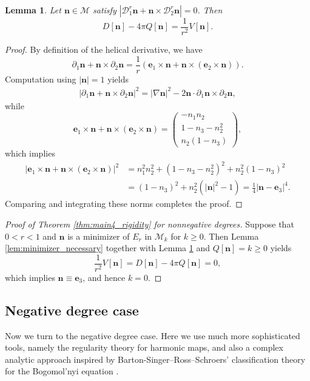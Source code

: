 \documentclass{amsart}
\numberwithin{equation}{section}
\newtheorem{lemma}[theorem]{Lemma}
\theoremstyle{definition}
\theoremstyle{remark}
\newcommand{\boD}{\mathcal{D}}
\newcommand{\boM}{\mathcal{M}}
\newcommand{\rd}{{\partial}}								%
\newcommand{\nab}{{\nabla}}							%
\newcommand{\bn}{{\mathbf{n}}}
\newcommand{\boe}{{\mathbf{e}}}
\begin{document}
\begin{lemma}\label{L9}
Let $\bn\in \boM$ satisfy $|\boD^r_1 \bn + \bn\times \boD^r_2 \bn| =0$. Then
$$
D[\bn] - 4\pi Q[\bn] = \frac 1{r^2} V[\bn].
$$
\end{lemma}
\begin{proof}
By definition of the helical derivative, we have
$$
\rd_1 \bn + \bn \times \rd_2 \bn = \frac 1r \left( \boe_1 \times \bn + \bn\times (\boe_2\times \bn)
\right).
$$
Computation using $|\bn|=1$ yields
\begin{align*}
|\rd_1 \bn + \bn\times \rd_2\bn|^2 = |\nab \bn|^2 - 2\bn\cdot \rd_1\bn \times \rd_2\bn,
\end{align*}
while
$$
\boe_1\times \bn +\bn\times (\boe_2\times \bn) = 
\begin{pmatrix}
-n_1n_2 \\ 
1-n_3 - n_2^2\\
n_2(1-n_3)
\end{pmatrix}
,
$$
which implies
\begin{align*}
|\boe_1\times \bn +\bn\times (\boe_2\times \bn)|^2
&=
n_1^2n_2^2 + (1-n_3-n_2^2)^2 + n_2^2(1-n_3)^2\\
&=
(1-n_3)^2 + n_2^2\left(|\bn|^2-1\right)
= \frac 14|\bn-\boe_3|^4.
\end{align*}
Comparing and integrating these norms completes the proof.
\end{proof}



\begin{proof}[Proof of Theorem \ref{thm:main4_rigidity} for nonnegative degrees]
Suppose that $0<r<1$ and $\bn$ is a minimizer of $E_r$ in $\boM_k$ for $k\geq0$.
Then Lemma \ref{lem:minimizer_necessary} together with Lemma \ref{L9} and $Q[\bn]=k\geq0$ yields
$$
\frac 1{r^2}V[\bn] = D[\bn] -4\pi Q[\bn] =0,
$$
which implies $\bn\equiv\boe_3$, and hence $k=0$. 
\end{proof}

\subsection{Negative degree case}

Now we turn to the negative degree case.
Here we use much more sophisticated tools, namely the regularity theory for harmonic maps, and also a complex analytic approach inspired by Barton-Singer--Ross--Schroers' classification theory for the Bogomol'nyi equation \cite{MR4091507}.
\end{document}
